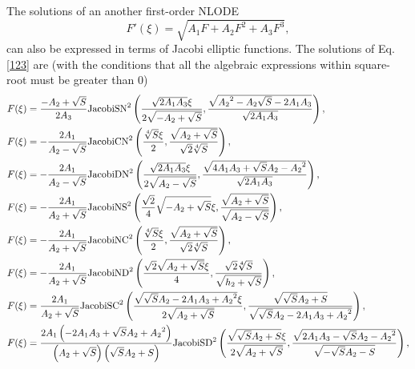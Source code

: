 \documentclass[prd,aps,floats,showkeys,nofootinbib,notitlepage]{revtex4}
\begin{document}
	The solutions of an another first-order NLODE \cite{fexpn123,Schwalm}
	\begin{equation}\label{123}
		F'(\xi)=\sqrt{A_1F+A_2F^2+A_3F^3}, 
	\end{equation}
	can also be expressed in terms of Jacobi elliptic functions. The solutions of Eq. \eqref{123} are (with the conditions that all the algebraic expressions within square-root must be greater than $0$)
	\begin{subequations}\label{123_solu}
		\begin{align}
			&F(\xi)=    \frac{{ - {A_2} + \sqrt S }}{{2{A_3}}}{\text{JacobiS}}{{\text{N}}^2}\left( { \frac{{\sqrt {2{A_1} {A_3}} \xi }}{{2\sqrt { - {A_2} + \sqrt S } }}, \frac{{\sqrt {{A_2}^2 - {A_2} \sqrt S  - 2 {A_1} {A_3}} }}{{\sqrt {2{A_1} {A_3}} }}} \right), \hfill \\
			&F(\xi)=    -  \frac{{2{A_1}}}{{{A_2} - \sqrt S }}{\text{JacobiC}}{{\text{N}}^2}\left( { \frac{{\sqrt[4]{S}\xi }}{2}, \frac{{\sqrt {{A_2} + \sqrt S } }}{{\sqrt 2 \sqrt[4]{S}}}} \right), \hfill \\
			&F(\xi)=    - \frac{{2{A_1}}}{{{A_2} - \sqrt S }}{\text{JacobiD}}{{\text{N}}^2}\left( {\frac{{\sqrt {2{A_1} {A_3}} \xi }}{{2\sqrt {{A_2} - \sqrt S } }}, \frac{{\sqrt {4 {A_1} {A_3} + \sqrt S {A_2} - {A_2}^2} }}{{\sqrt {2{A_1} {A_3}} }}} \right), \hfill \\
			&F(\xi)=    - \frac{{2{A_1}}}{{{A_2} + \sqrt S }}{\text{JacobiN}}{{\text{S}}^2}\left( { \frac{{\sqrt 2 }}{4}\sqrt { - {A_2} + \sqrt S } \xi ,\frac{{\sqrt {{A_2} + \sqrt S } }}{{\sqrt {{A_2} - \sqrt S } }}} \right), \hfill \\
			&F(\xi)=    - \frac{{2{A_1}}}{{{A_2} + \sqrt S }}{\text{JacobiN}}{{\text{C}}^2}\left( { \frac{{\sqrt[4]{S}\xi }}{2},\frac{{\sqrt {{A_2} + \sqrt S } }}{{\sqrt 2 \sqrt[4]{S}}}} \right), \hfill \\
			&F(\xi)=    - \frac{{2{A_1}}}{{{A_2} + \sqrt S }}{\text{JacobiN}}{{\text{D}}^2}\left( { \frac{{\sqrt 2 \sqrt {{A_2} + \sqrt S } \xi }}{4},\frac{{\sqrt 2 \sqrt[4]{S}}}{{\sqrt {{h_2} + \sqrt S } }}} \right), \hfill \\
			&F(\xi)=   \frac{{2{A_1}}}{{{A_2} + \sqrt S }}{\text{JacobiS}}{{\text{C}}^2}\left( {\frac{{\sqrt {\sqrt S {A_2} - 2 {A_1} {A_3} + {A_2}^2} \xi }}{{2\sqrt {{A_2} + \sqrt S } }},\frac{{\sqrt {\sqrt S {A_2} + S} }}{{\sqrt {\sqrt S {A_2} - 2 {A_1} {A_3} + {A_2}^2} }}} \right), \hfill \\
			&F(\xi)=   \frac{{2{A_1} \left( { - 2 {A_1} {A_3} + \sqrt S {A_2} + {A_2}^2} \right)}}{{\left( {{A_2} + \sqrt S } \right)\left( {\sqrt S {A_2} + S} \right)}}{\text{JacobiS}}{{\text{D}}^2}\left( {\frac{{\sqrt {\sqrt S {A_2} + S} \xi }}{{2\sqrt {{A_2} + \sqrt S } }},\frac{{\sqrt {2 {A_1} {A_3} - \sqrt S {A_2} - {A_2}^2} }}{{\sqrt { - \sqrt S {A_2} - S} }}} \right), \hfill \\

\end{align}
\end{subequations}
\end{document}
